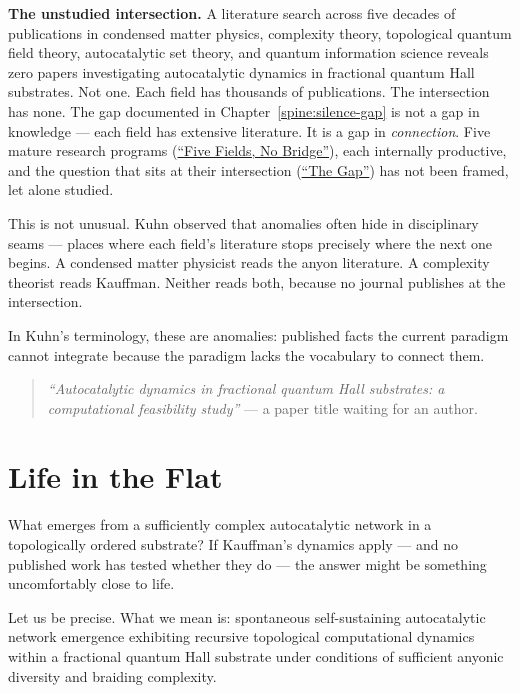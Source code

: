 \textbf{The unstudied intersection.} A literature search across five decades of publications in condensed matter physics, complexity theory, topological quantum field theory, autocatalytic set theory, and quantum information science reveals zero papers investigating autocatalytic dynamics in fractional quantum Hall substrates. Not one. Each field has thousands of publications. The intersection has none. The gap documented in Chapter~\ref{spine:silence-gap} is not a gap in knowledge --- each field has extensive literature. It is a gap in \emph{connection}. Five mature research programs (\hyperref[spine:sg-five-fields-no-bridge]{``Five Fields, No Bridge''}), each internally productive, and the question that sits at their intersection (\hyperref[spine:sg-the-gap]{``The Gap''}) has not been framed, let alone studied.

This is not unusual. Kuhn observed that anomalies often hide in disciplinary seams --- places where each field's literature stops precisely where the next one begins. A condensed matter physicist reads the anyon literature. A complexity theorist reads Kauffman. Neither reads both, because no journal publishes at the intersection.

In Kuhn's terminology, these are anomalies: published facts the current paradigm cannot integrate because the paradigm lacks the vocabulary to connect them.

\begin{quote}\small
\textit{``Autocatalytic dynamics in fractional quantum Hall substrates:
a computational feasibility study''} --- a paper title waiting for an author.
\end{quote}

\section*{Life in the Flat}
\label{spine:sr-life-in-the-flat}

What emerges from a sufficiently complex autocatalytic network in a topologically ordered substrate? If Kauffman's dynamics apply --- and no published work has tested whether they do --- the answer might be something uncomfortably close to life.

Let us be precise. What we mean is: spontaneous self-sustaining autocatalytic network emergence exhibiting recursive topological computational dynamics within a fractional quantum Hall substrate under conditions of sufficient anyonic diversity and braiding complexity.

